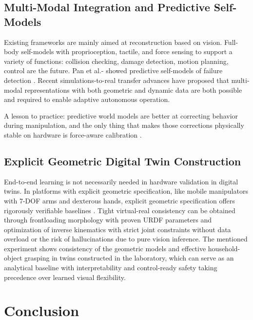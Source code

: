 \documentclass[11pt,a4paper]{article}
\begin{document}
\subsection{Multi-Modal Integration and Predictive Self-Models}

Existing frameworks are mainly aimed at reconstruction based on vision. Full-body self-models with proprioception, tactile, and force sensing to support a variety of functions: collision checking, damage detection, motion planning, control are the future. Pan et al.- showed predictive self-models of failure detection \cite{pan2025selfcorrecting}. Recent simulations-to-real transfer advances have proposed that multi-modal representations with both geometric and dynamic data are both possible and required to enable adaptive autonomous operation.

A lesson to practice: predictive world models are better at correcting behavior during manipulation, and the only thing that makes those corrections physically stable on hardware is force-aware calibration \cite{pan2025selfcorrecting,bytedance2025closing}.

\subsection{Explicit Geometric Digital Twin Construction}

End-to-end learning is not necessarily needed in hardware validation in digital twins. In platforms with explicit geometric specification, like mobile manipulators with 7-DOF arms and dexterous hands, explicit geometric specification offers rigorously verifiable baselines \cite{jiang2024digitaltwin}. Tight virtual-real consistency can be obtained through frontloading morphology with proven URDF parameters and optimization of inverse kinematics with strict joint constraints without data overload or the risk of hallucinations due to pure vision inference. The mentioned experiment shows consistency of the geometric models and effective household-object grasping in twins constructed in the laboratory, which can serve as an analytical baseline with interpretability and control-ready safety taking precedence over learned visual flexibility.



\section{Conclusion}
\label{sec:conclusion}
\end{document}
